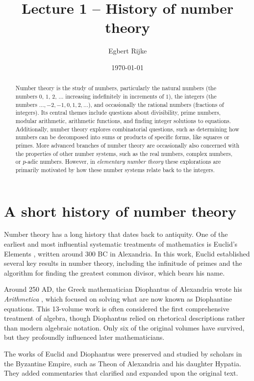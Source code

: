 \documentclass{article}
\title{Lecture 1 -- History of number theory}
\author{Egbert Rijke}
\date{\today}
\theoremstyle{definition}
\theoremstyle{remark}
\begin{document}
\maketitle

\begin{abstract}
Number theory is the study of numbers, particularly the natural numbers (the numbers $0$, $1$, $2$, $\ldots$ increasing indefinitely in increments of $1$), the integers (the numbers $\ldots, -2, -1, 0, 1, 2, \ldots$), and occasionally the rational numbers (fractions of integers). Its central themes include questions about divisibility, prime numbers, modular arithmetic, arithmetic functions, and finding integer solutions to equations. Additionally, number theory explores combinatorial questions, such as determining how numbers can be decomposed into sums or products of specific forms, like squares or primes. More advanced branches of number theory are occasionally also concerned with the properties of other number systems, such as the real numbers, complex numbers, or $p$-adic numbers. However, in \emph{elementary number theory} these explorations are primarily motivated by how these number systems relate back to the integers.  
\end{abstract}

\section{A short history of number theory}
Number theory has a long history that dates back to antiquity. One of the earliest and most influential systematic treatments of mathematics is Euclid's Elements \cite{euclid1908}, written around 300 BC in Alexandria. In this work, Euclid established several key results in number theory, including the infinitude of primes and the algorithm for finding the greatest common divisor, which bears his name.

Around 250 AD, the Greek mathematician Diophantus of Alexandria wrote his \emph{Arithmetica} \cite{diophantus1910}, which focused on solving what are now known as Diophantine equations. This 13-volume work is often considered the first comprehensive treatment of algebra, though Diophantus relied on rhetorical descriptions rather than modern algebraic notation. Only six of the original volumes have survived, but they profoundly influenced later mathematicians.

The works of Euclid and Diophantus were preserved and studied by scholars in the Byzantine Empire, such as Theon of Alexandria and his daughter Hypatia. They added commentaries that clarified and expanded upon the original text.
\end{document}

